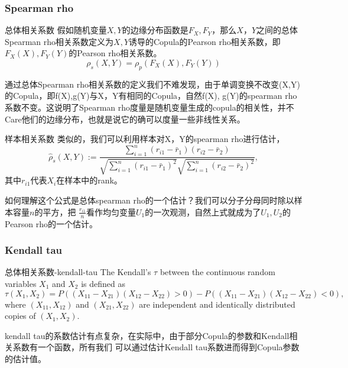 \documentclass[12pt]{article}
\theoremstyle{definition}
\begin{document}
\subsubsection{Spearman rho}
\begin{sdefinition}{总体相关系数}{}
假如随机变量$X,Y$的边缘分布函数是$F_X, F_Y$，那么$X，Y$之间的总体Spearman rho相关系数定义为$X,Y$诱导的Copula的Pearson rho相关系数，即$F_X(X), F_Y(Y)$的Pearson rho相关系数。
$$
\rho_s(X,Y) = \rho_p (F_X(X),F_Y(Y))
$$
\end{sdefinition}
\begin{sremark}{}{}
	通过总体Spearman rho相关系数的定义我们不难发现，由于单调变换不改变(X,Y)的Copula，即f(X),g(Y)与X，Y有相同的Copula，自然f(X), g(Y)的spearman rho系数不变。这说明了Spearman rho度量是随机变量生成的copula的相关性，并不Care他们的边缘分布，也就是说它的确可以度量一些非线性关系。
\end{sremark}

\begin{sdefinition}{样本相关系数}{}
类似的，我们可以利用样本对X，Y的spearman rho进行估计，
$$
\hat{\rho}_s\left(X, Y\right):=\frac{\sum_{i=1}^n\left(r_{i 1}-\bar{r}_1\right)\left(r_{i 2}-\bar{r}_2\right)}{\sqrt{\sum_{i=1}^n\left(r_{i 1}-\bar{r}_1\right)^2} \sqrt{\sum_{i=1}^n\left(r_{i 2}-\bar{r}_2\right)^2}},
$$
其中$r_{i1}$代表$X_i$在样本中的rank。
\end{sdefinition}
\begin{sremark}{}{}
如何理解这个公式是总体spearman rho的一个估计？我们可以分子分母同时除以样本容量$n$的平方，把
$\frac{r_{i1}}{n}$看作均匀变量$U_1$的一次观测，自然上式就成为了$U_1,U_2$的Pearson rho的一个估计。	
\end{sremark}



\subsubsection{Kendall tau}
\begin{sdefinition}{总体相关系数-kendall-tau}{}
The Kendall's $\tau$ between the continuous random variables $X_1$ and $X_2$ is defined as
$$
\tau\left(X_1, X_2\right)=P\left(\left(X_{11}-X_{21}\right)\left(X_{12}-X_{22}\right)>0\right)-P\left(\left(X_{11}-X_{21}\right)\left(X_{12}-X_{22}\right)<0\right),
$$
where $\left(X_{11}, X_{12}\right)$ and $\left(X_{21}, X_{22}\right)$ are independent and identically distributed copies of $\left(X_1, X_2\right)$.
\end{sdefinition}
kendall tau的系数估计有点复杂，在实际中，由于部分Copula的参数和Kendall相关系数有一个函数，所有我们
可以通过估计Kendall tau系数进而得到Copula参数的估计值。
\end{document}
